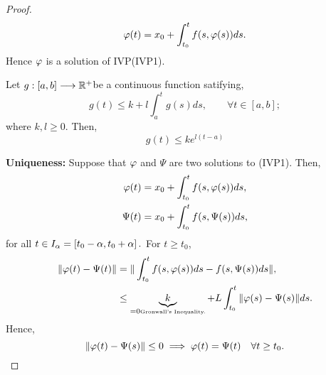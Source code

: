 \begin{proof}
\[
\varphi(t) = x_0 + \int_{t_0}^{t} f(s, \varphi(s) ) ds.
\]
Hence $\varphi $ is a solution of IVP(IVP1). \\
\begin{corollary}
  Let $ g : [a,b]  \longrightarrow \mathbb{R} ^{+} $be a continuous function satifying, 
  \[
  g(t)  \leq  k + l \int_{a}^{t} g(s)  ds,   \quad \quad 
  \forall t \in   [a,b];
  \]
  where $ k, l \geq  0. $ Then, 
  \[
  g(t)  \leq  k e^{l (t-a) }
  \]
\end{corollary}
\noindent{} \textbf{Uniqueness:} Suppose that $\varphi $ and $\Psi  $ are two solutions to (IVP1). 
Then,
\begin{align*}
  \varphi(t)  &= x_0 + \int_{t_0}^{t}  f(s, \varphi(s) ) ds, \\
  \Psi (t)  &= x_0 + \int_{t_0}^{t}  f(s, \Psi (s) ) ds, \\ 
\end{align*}
for all $t \in   I_{\alpha} = \left[ t_0 - \alpha, t_0 + \alpha \right]. $ For $t \geq t_0 $, 
\begin{align*}
  \| \varphi(t) - \Psi (t)  \| &= 
  \| \int_{ t_0}^{t} f(s, \varphi(s) ) ds - f(s, \Psi (s) ) ds \|, \\
                           & \leq 
                           \underbrace{k}_{= 0 \text{\tiny Gronwall's Inequality.}  } +
                           L \int_{t_0}^{t} \| \varphi(s)  - \Psi (s)  \| ds.
\end{align*}
Hence, 
\[
\| \varphi(t) - \Psi (s)  \| \leq  0 \implies 
\varphi(t)  = \Psi (t)  \quad \forall t \geq t_0.
\]
\end{proof}
